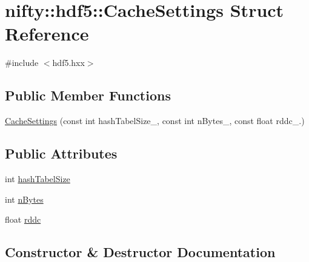 \hypertarget{structnifty_1_1hdf5_1_1CacheSettings}{}\section{nifty\+:\+:hdf5\+:\+:Cache\+Settings Struct Reference}
\label{structnifty_1_1hdf5_1_1CacheSettings}


{\ttfamily \#include $<$hdf5.\+hxx$>$}

\subsection*{Public Member Functions}
\begin{DoxyCompactItemize}
\item 
\hyperlink{structnifty_1_1hdf5_1_1CacheSettings_aec0f428279a22300e530e134fa2b3947}{Cache\+Settings} (const int hash\+Tabel\+Size\+\_, const int n\+Bytes\+\_, const float rddc\+\_.)
\end{DoxyCompactItemize}
\subsection*{Public Attributes}
\begin{DoxyCompactItemize}
\item 
int \hyperlink{structnifty_1_1hdf5_1_1CacheSettings_ae99c704f44afa6ac669943633d859670}{hash\+Tabel\+Size}
\item 
int \hyperlink{structnifty_1_1hdf5_1_1CacheSettings_a95ec4250fd35413350f8a0bdbb78beed}{n\+Bytes}
\item 
float \hyperlink{structnifty_1_1hdf5_1_1CacheSettings_abdcd0cbeacf12d8fa7ea533213e4366a}{rddc}
\end{DoxyCompactItemize}


\subsection{Constructor \& Destructor Documentation}
\mbox{\label{structnifty_1_1hdf5_1_1CacheSettings_aec0f428279a22300e530e134fa2b3947}} 

